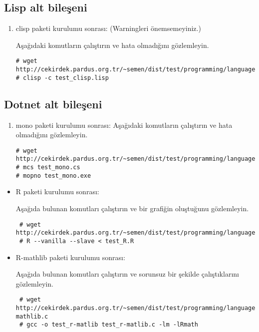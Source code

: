 \documentclass[a4paper,10pt]{article}
\begin{document}
\subsection{Lisp alt bileşeni}
\begin{enumerate}
 \item clisp paketi kurulumu sonrası: (Warningleri önemsemeyiniz.)

Aşağıdaki komutların çalıştırın ve hata olmadığını gözlemleyin.
\begin{verbatim}
# wget http://cekirdek.pardus.org.tr/~semen/dist/test/programming/language/lisp/test_clisp.lisp 
# clisp -c test_clisp.lisp
\end{verbatim}

\end{enumerate}
\subsection{Dotnet alt bileşeni}
\begin{enumerate}
 \item mono paketi kurulumu sonrası:
Aşağıdaki komutların çalıştırın ve hata olmadığını gözlemleyin.
\begin{verbatim}
# wget http://cekirdek.pardus.org.tr/~semen/dist/test/programming/language/dotnet/test_mono.cs
# mcs test_mono.cs
# mopno test_mono.exe
\end{verbatim}
\end{enumerate}


\begin{itemize}
 \item R paketi kurulumu sonrası:

Aşağıda bulunan komutları çalıştırın ve bir grafiğin oluştuğunu gözlemleyin.
\begin{verbatim}
 # wget http://cekirdek.pardus.org.tr/~semen/dist/test/programming/language/test_R.R
 # R --vanilla --slave < test_R.R
\end{verbatim}
\item R-mathlib paketi kurulumu sonrası:

Aşağıda bulunan komutları çalıştırın ve sorunsuz bir şekilde çalıştıklarını gözlemleyin.	
\begin{verbatim}
 # wget http://cekirdek.pardus.org.tr/~semen/dist/test/programming/language/test_r-mathlib.c
 # gcc -o test_r-matlib test_r-matlib.c -lm -lRmath
\end{verbatim}
\end{itemize}
\end{document}
